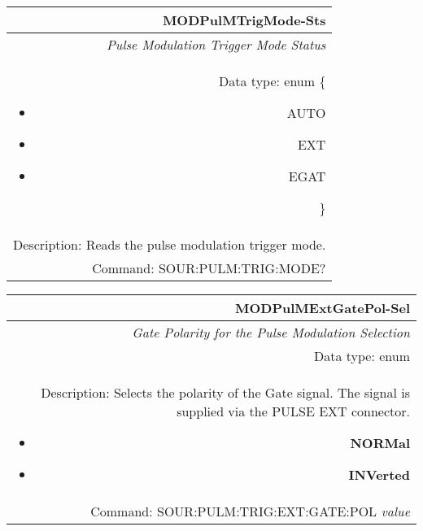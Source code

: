 \documentclass[openany]{article}
\begin{document}
		\begin{tabular}{N}
			\hline
			\bfseries MODPulMTrigMode-Sts \\ \hline
			\emph{Pulse Modulation Trigger Mode Status} \\
			Data type: enum \{\begin{itemize}[noitemsep]
				\small
				\item[] AUTO
				\item[] EXT
				\item[] EGAT
			\end{itemize}\} \\ 
			Description: Reads the pulse modulation trigger mode. \\
			Command: SOUR:PULM:TRIG:MODE? \\

		\end{tabular}
%
		\begin{tabular}{N}
			\hline
			\bfseries MODPulMExtGatePol-Sel \\ \hline
			\emph{Gate Polarity for the Pulse Modulation Selection} \\
			Data type: enum \\  
			Description: Selects the polarity of the Gate signal. The signal is supplied via the PULSE EXT connector. \begin{itemize}[noitemsep]
				\small
				\item[] \textbf{NORMal}
                                \item[] \textbf{INVerted}
			\end{itemize} \\
			Command: SOUR:PULM:TRIG:EXT:GATE:POL \emph{value} \\

		\end{tabular}
\end{document}
